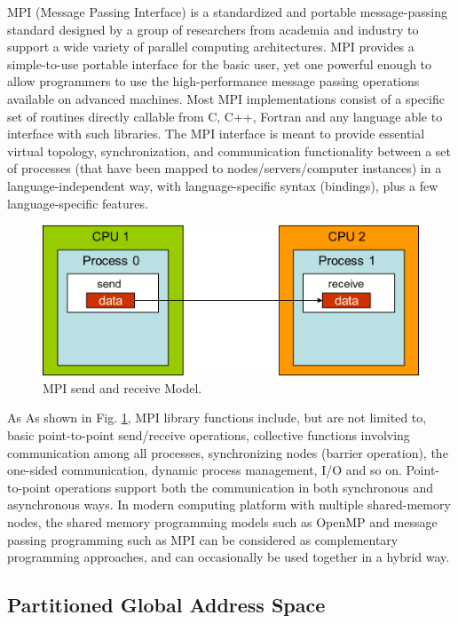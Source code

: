 MPI (Message Passing Interface) \cite{gropp1999using} is a standardized and portable message-passing standard designed by a group of researchers from academia and industry to support a wide variety of parallel computing architectures. MPI provides a simple-to-use portable interface for the basic user, yet one powerful enough to allow programmers to use the high-performance message passing operations available on advanced machines. Most MPI implementations consist of a specific set of routines directly callable from C, C++, Fortran and any language able to interface with such libraries. The MPI interface is meant to provide essential virtual topology, synchronization, and communication functionality between a set of processes (that have been mapped to nodes/servers/computer instances) in a language-independent way, with language-specific syntax (bindings), plus a few language-specific features. 

\begin{figure}[htbp]
	\centering
	\includegraphics[width=5.4in]{fig/mpi_send_recv.jpg}
	\caption{MPI send and receive Model.}
	\label{mpi_model}
\end{figure}

As As shown in Fig. \ref{mpi_model}, MPI library functions include, but are not limited to, basic point-to-point send/receive operations, collective functions involving communication among all processes, synchronizing nodes (barrier operation), the one-sided communication, dynamic process management, I/O and so on. Point-to-point operations support both the communication in both synchronous and asynchronous ways. In modern computing platform with multiple shared-memory nodes, the shared memory programming models such as OpenMP and message passing programming such as MPI can be considered as complementary programming approaches, and can occasionally be used together in a hybrid way.

\subsection{Partitioned Global Address Space}

